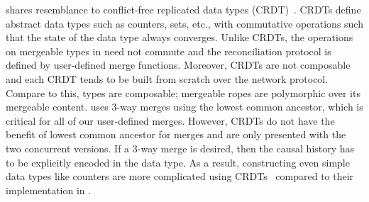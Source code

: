 \name shares resemblance to conflict-free replicated data types
(CRDT)~\cite{crdt}. CRDTs define abstract data types such as counters, sets,
etc., with commutative operations such that the state of the data type always
converges. Unlike CRDTs, the operations on mergeable types in \name need not
commute and the reconciliation protocol is defined by user-defined merge
functions. Moreover, CRDTs are not composable and each CRDT tends to be built
from scratch over the network protocol. Compare to this, \name types are
composable; mergeable ropes are polymorphic over its mergeable content. \name
uses 3-way merges using the lowest common ancestor, which is critical for all
of our user-defined merges. However, CRDTs do not have the benefit of lowest
common ancestor for merges and are only presented with the two concurrent
versions. If a 3-way merge is desired, then the causal history has to be
explicitly encoded in the data type. As a result, constructing even simple data
types like counters are more complicated using CRDTs~\cite{crdt} compared to
their implementation in \name.
